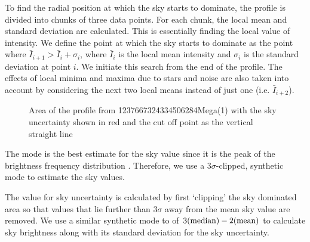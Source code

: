 To find the radial position at which the sky starts to dominate, the profile is divided into chunks of three data points. For each chunk, the local mean and standard deviation are calculated. This is essentially finding the local value of intensity. We define the point at which the sky starts to dominate as the point where $\bar{I}_{i+1} > \bar{I}_i + \sigma_i$, where $\bar{I}_i$ is the local mean intensity and $\sigma_i$ is the standard deviation at point $i$. We initiate this search from the end of the profile. The effects of local minima and maxima due to stars and noise are also taken into account by considering the next two local means instead of just one (i.e. $\bar{I}_{i+2}$).

\begin{figure}[h]
	\caption{Area of the profile from 1237667324334506284Mega(1) with the sky uncertainty shown in red and the cut off point as the vertical straight line}
\end{figure}

The mode is the best estimate for the sky value since it is the peak of the brightness frequency distribution \citep{bijaoui_sky_1980}. Therefore, we use a $3\sigma$-clipped, synthetic mode to estimate the sky values.

The value for sky uncertainty is calculated by first `clipping' the sky dominated area so that values that lie further than $3\sigma$ away from the mean sky value are removed. We use a similar synthetic mode to \citet{peng_detailed_2010} of $3(\rm{median}) - 2(\rm{mean})$ to calculate sky brightness along with its standard deviation for the sky uncertainty.

